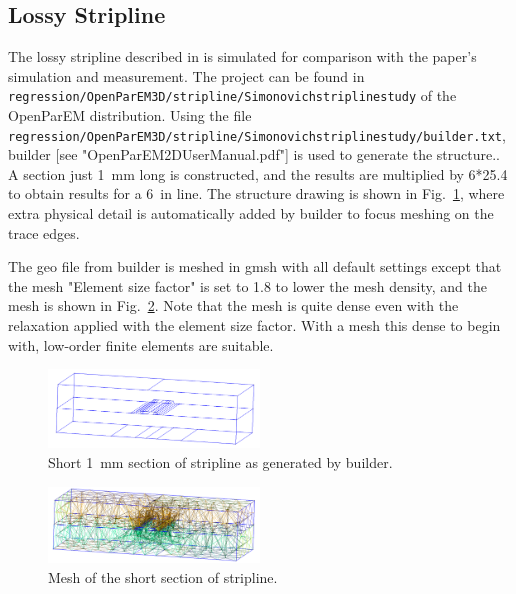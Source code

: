 \documentclass[titlepage]{article}
\renewcommand\_{\textunderscore\linebreak[1]}
\begin{document}
\subsection{Lossy Stripline}

The lossy stripline described in \cite{Simonovich} is simulated for comparison with the paper's simulation and measurement.
The project can be found in \texttt{regression/OpenParEM3D/stripline/Simonovich\_stripline\_study} of the OpenParEM distribution.
Using the file \texttt{regression/OpenParEM3D/stripline/Simonovich\_stripline\_study/builder.txt}, builder [see "OpenParEM2D\_User\_Manual.pdf"] is used to generate the structure..
A section just 1~mm long is constructed, and the results are multiplied by 6*25.4 to obtain results for a 6~in line.
The structure drawing is shown in Fig.~\ref{fig:stripline_drawing}, where extra physical detail is automatically added by builder to focus meshing on the trace edges.

The geo file from builder is meshed in gmsh with all default settings except that the mesh "Element size factor" is set to 1.8 to lower the mesh density, and the mesh is shown in Fig.~\ref{fig:stripline_mesh}.  Note that the mesh is quite dense even with the relaxation applied with the element size factor.  With a mesh this dense to begin with, low-order finite elements are suitable.

\begin{figure}[H]
  \centering
  \includegraphics[width=0.5\textwidth]{../regression/OpenParEM3D/stripline/Simonovich_stripline_study/screenshots/stripline_drawing}
  \caption{Short 1~mm section of stripline as generated by builder.}
  \label{fig:stripline_drawing}
\end{figure}

\begin{figure}[H]
  \centering
  \includegraphics[width=0.5\textwidth]{../regression/OpenParEM3D/stripline/Simonovich_stripline_study/screenshots/stripline_mesh}
  \caption{Mesh of the short section of stripline.}
  \label{fig:stripline_mesh}
\end{figure}
\end{document}

